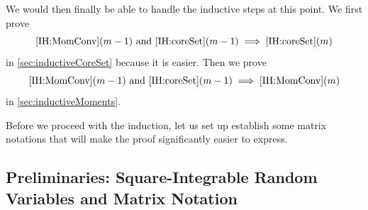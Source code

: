 \documentclass[main.tex]{subfiles}
\begin{document}
We would then finally be able to handle the inductive steps at this point.
We first prove
\begin{equation*}
\text{\ref{IH:MomConv}$(m-1)$ and \ref{IH:coreSet}$(m-1)$} \implies \text{\ref{IH:coreSet}}(m)
\end{equation*}
in \cref{sec:inductiveCoreSet} because it is easier.
Then we prove
\begin{equation*}
\text{\ref{IH:MomConv}$(m-1)$ and \ref{IH:coreSet}$(m-1)$} \implies \text{\ref{IH:MomConv}}(m)
\end{equation*}
in \cref{sec:inductiveMoments}.

Before we proceed with the induction, let us set up establish some matrix notations that will make the proof significantly easier to express.

\subsection{Preliminaries: Square-Integrable Random Variables and Matrix Notation}

\newcommand{\LsqZ}{\mathcal{L}}
\end{document}
